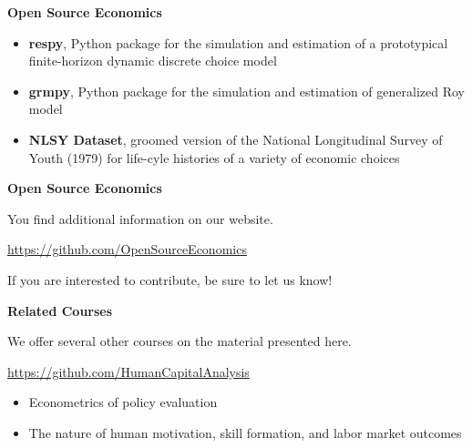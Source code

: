 \begin{frame}\textbf{Open Source Economics}\vspace{0.3cm}

\begin{itemize}\setlength\itemsep{1em}
\item \textbf{respy}, Python package for the simulation and estimation of a prototypical finite-horizon dynamic discrete choice model
\item \textbf{grmpy}, Python package for the simulation and estimation of generalized Roy model
\item \textbf{NLSY Dataset}, groomed version of the National Longitudinal Survey of Youth (1979) for life-cyle histories of a variety of economic choices
\end{itemize}

\end{frame}
\begin{frame}
	\textbf{Open Source Economics}\vspace{0.3cm}

You find additional information on our website.

\begin{center}
\url{https://github.com/OpenSourceEconomics}
\end{center}

If you are interested to contribute, be sure to let us know!

\end{frame}
\begin{frame}
	\textbf{Related Courses}\vspace{0.3cm}

We offer several other courses on the material presented here.

	\begin{center}
	\url{https://github.com/HumanCapitalAnalysis}
	\end{center}


	\begin{itemize}\setlength\itemsep{1em}
	\item Econometrics of policy evaluation
	\item The nature of human motivation, skill formation, and labor market outcomes
	\end{itemize}

\end{frame}
